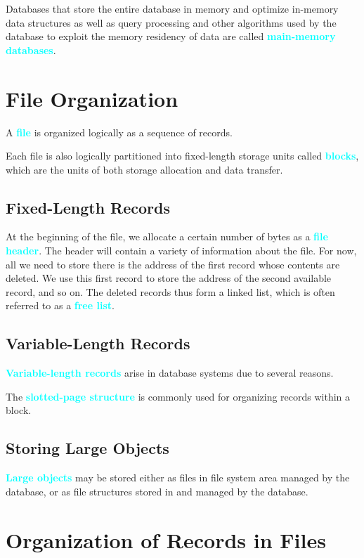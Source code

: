 \documentclass[a4paper,12pt,twoside,openany]{book}
\newcommand{\textcy}[1]{\textbf{\textcolor{cyan}{#1}}}
\begin{document}
Databases that store the entire database in memory and optimize in-memory data structures as well as query processing and other algorithms used by the database to exploit the memory residency of data are called \textcy{main-memory databases}.

\section{File Organization}

A \textcy{file} is organized logically as a sequence of records.

Each file is also logically partitioned into fixed-length storage units called \textcy{blocks}, which are the units of both storage allocation and data transfer.

\subsection{Fixed-Length Records}

At the beginning of the file, we allocate a certain number of bytes as a \textcy{file header}. The header will contain a variety of information about the file. For now, all we need to store there is the address of the first record whose contents are deleted. We use this first record to store the address of the second available record, and so on. The deleted records thus form a linked list, which is often referred to as a \textcy{free list}.

\subsection{Variable-Length Records}

\textcy{Variable-length records} arise in database systems due to several reasons.

The \textcy{slotted-page structure} is commonly used for organizing records within a block.

\subsection{Storing Large Objects}

\textcy{Large objects} may be stored either as files in file system area managed by the database, or as file structures stored in and managed by the database.

\section{Organization of Records in Files}
\end{document}
